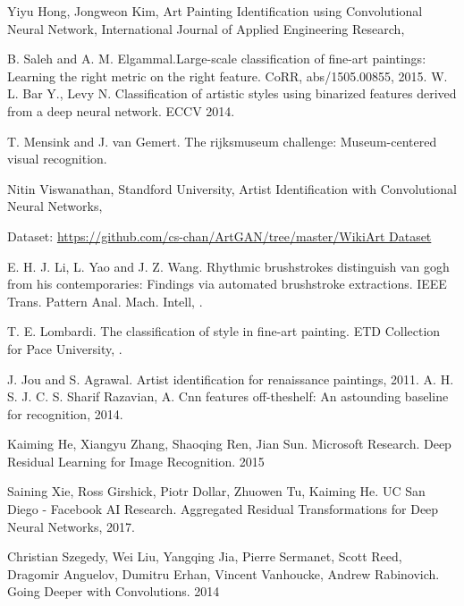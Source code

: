 \documentclass{article}
\begin{document}
\begin{thebibliography}{1}
	
	Yiyu Hong, Jongweon Kim, \newblock  Art Painting Identification using Convolutional Neural Network, \newblock International Journal of Applied Engineering Research, 
	
	B. Saleh and A. M. Elgammal.\newblock  Large-scale classification
	of fine-art paintings: Learning the right metric on the right
	feature. \newblock CoRR, abs/1505.00855, 2015.
	W. L. Bar Y., Levy N. Classification of artistic styles using binarized features derived from a deep neural network.
	ECCV 2014.
	
	T. Mensink and J. van Gemert. \newblock The rijksmuseum challenge:
	Museum-centered visual recognition. 
	
	
	Nitin Viswanathan, Standford University,
	\newblock Artist Identification with Convolutional Neural Networks, 
	
	Dataset:
	\url{https://github.com/cs-chan/ArtGAN/tree/master/WikiArt Dataset}
	
	E. H. J. Li, L. Yao and J. Z. Wang. \newblock Rhythmic brushstrokes
	distinguish van gogh from his contemporaries: Findings via
	automated brushstroke extractions. IEEE Trans. Pattern
	Anal. Mach. Intell, .
		
	T. E. Lombardi. \newblock The classification of style in fine-art painting. ETD Collection for Pace University, .
	
	J. Jou and S. Agrawal. Artist identification for renaissance
	paintings, 2011.
	A. H. S. J. C. S. Sharif Razavian, A. Cnn features off-theshelf: An astounding baseline for recognition, 2014.
	
	Kaiming He, Xiangyu Zhang, Shaoqing Ren, Jian Sun. Microsoft Research. 
	Deep Residual Learning for Image Recognition. 2015
	
	Saining Xie, Ross Girshick, Piotr Dollar, Zhuowen Tu, Kaiming He. UC San Diego - Facebook AI Research. Aggregated Residual Transformations for Deep Neural Networks, 2017.
	
	Christian Szegedy, Wei Liu, Yangqing Jia, Pierre Sermanet, Scott Reed, Dragomir Anguelov, Dumitru Erhan, Vincent Vanhoucke, Andrew Rabinovich. Going Deeper with Convolutions. 2014
	

\end{thebibliography}
\end{document}
